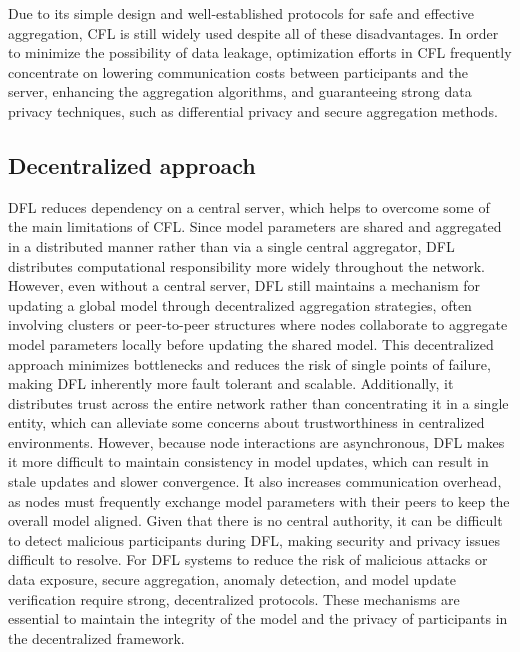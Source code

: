Due to its simple design and well-established protocols for safe and effective aggregation, \gls{CFL} is still widely used despite all of these disadvantages. In order to minimize the possibility of data leakage, optimization efforts in \gls{CFL} frequently concentrate on lowering communication costs between participants and the server, enhancing the aggregation algorithms, and guaranteeing strong data privacy techniques, such as differential privacy and secure aggregation methods.

\subsection{Decentralized approach}
\label{sub:fl_decentralized_approach}

\gls{DFL} reduces dependency on a central server, which helps to overcome some of the main limitations of CFL. Since model parameters are shared and aggregated in a distributed manner rather than via a single central aggregator, DFL distributes computational responsibility more widely throughout the network.
However, even without a central server, \gls{DFL} still maintains a mechanism for updating a global model through decentralized aggregation strategies, often involving clusters or peer-to-peer structures where nodes collaborate to aggregate model parameters locally before updating the shared model.
This decentralized approach minimizes bottlenecks and reduces the risk of single points of failure, making DFL inherently more fault tolerant and scalable. Additionally, it distributes trust across the entire network rather than concentrating it in a single entity, which can alleviate some concerns about trustworthiness in centralized environments. However, because node interactions are asynchronous, DFL makes it more difficult to maintain consistency in model updates, which can result in stale updates and slower convergence. It also increases communication overhead, as nodes must frequently exchange model parameters with their peers to keep the overall model aligned.
Given that there is no central authority, it can be difficult to detect malicious participants during DFL, making security and privacy issues difficult to resolve. For \gls{DFL} systems to reduce the risk of malicious attacks or data exposure, secure aggregation, anomaly detection, and model update verification require strong, decentralized protocols. These mechanisms are essential to maintain the integrity of the model and the privacy of participants in the decentralized framework. 


